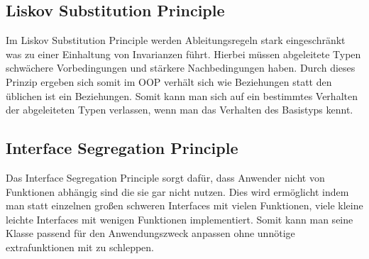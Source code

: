 
\subsection{Liskov Substitution Principle}
Im Liskov Substitution Principle werden Ableitungsregeln stark eingeschränkt was zu einer Einhaltung von Invarianzen führt.
Hierbei müssen abgeleitete Typen schwächere Vorbedingungen und stärkere Nachbedingungen haben.
Durch dieses Prinzip ergeben sich somit im OOP \glqq verhält sich wie\grqq{} Beziehungen statt den üblichen \glqq ist ein\grqq{} Beziehungen.
Somit kann man sich auf ein bestimmtes Verhalten der abgeleiteten Typen verlassen, wenn man das Verhalten des Basistyps kennt.

\subsection{Interface Segregation Principle}
Das Interface Segregation Principle sorgt dafür, dass Anwender nicht von Funktionen abhängig sind die sie gar nicht nutzen.
Dies wird ermöglicht indem man statt einzelnen großen schweren Interfaces mit vielen Funktionen, viele kleine leichte Interfaces mit wenigen Funktionen implementiert.
Somit kann man seine Klasse passend für den Anwendungszweck anpassen ohne unnötige extrafunktionen mit zu schleppen.

